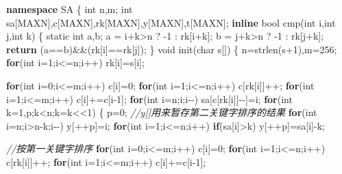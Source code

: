 \documentclass[
]{article}
\newenvironment{Shaded}{}{}
\newcommand{\AttributeTok}[1]{\textcolor[rgb]{0.49,0.56,0.16}{#1}}
\newcommand{\CommentTok}[1]{\textcolor[rgb]{0.38,0.63,0.69}{\textit{#1}}}
\newcommand{\ControlFlowTok}[1]{\textcolor[rgb]{0.00,0.44,0.13}{\textbf{#1}}}
\newcommand{\DataTypeTok}[1]{\textcolor[rgb]{0.56,0.13,0.00}{#1}}
\newcommand{\DecValTok}[1]{\textcolor[rgb]{0.25,0.63,0.44}{#1}}
\newcommand{\KeywordTok}[1]{\textcolor[rgb]{0.00,0.44,0.13}{\textbf{#1}}}
\newcommand{\NormalTok}[1]{#1}
\begin{document}
\begin{Shaded}
\begin{Highlighting}[]
\KeywordTok{namespace}\NormalTok{ SA}
\NormalTok{\{}
    \DataTypeTok{int}\NormalTok{ n,m;}
    \DataTypeTok{int}\NormalTok{ sa[MAXN],c[MAXN],rk[MAXN],y[MAXN],t[MAXN];}
    \KeywordTok{inline} \DataTypeTok{bool}\NormalTok{ cmp(}\DataTypeTok{int}\NormalTok{ i,}\DataTypeTok{int}\NormalTok{ j,}\DataTypeTok{int}\NormalTok{ k)}
\NormalTok{    \{}
        \AttributeTok{static} \DataTypeTok{int}\NormalTok{ a,b;}
\NormalTok{        a = i+k\textgreater{}n ? {-}}\DecValTok{1}\NormalTok{ : rk[i+k];}
\NormalTok{        b = j+k\textgreater{}n ? {-}}\DecValTok{1}\NormalTok{ : rk[j+k];}
        \ControlFlowTok{return}\NormalTok{ (a==b)\&\&(rk[i]==rk[j]);}
\NormalTok{    \}}
    \DataTypeTok{void}\NormalTok{ init(}\DataTypeTok{char}\NormalTok{ s[])}
\NormalTok{    \{}
\NormalTok{        n=strlen(s+}\DecValTok{1}\NormalTok{),m=}\DecValTok{256}\NormalTok{;}
        \ControlFlowTok{for}\NormalTok{(}\DataTypeTok{int}\NormalTok{ i=}\DecValTok{1}\NormalTok{;i\textless{}=n;i++) rk[i]=s[i];}

        \ControlFlowTok{for}\NormalTok{(}\DataTypeTok{int}\NormalTok{ i=}\DecValTok{0}\NormalTok{;i\textless{}=m;i++) c[i]=}\DecValTok{0}\NormalTok{;}
        \ControlFlowTok{for}\NormalTok{(}\DataTypeTok{int}\NormalTok{ i=}\DecValTok{1}\NormalTok{;i\textless{}=n;i++) c[rk[i]]++;}
        \ControlFlowTok{for}\NormalTok{(}\DataTypeTok{int}\NormalTok{ i=}\DecValTok{1}\NormalTok{;i\textless{}=m;i++) c[i]+=c[i{-}}\DecValTok{1}\NormalTok{];}
        \ControlFlowTok{for}\NormalTok{(}\DataTypeTok{int}\NormalTok{ i=n;i;i{-}{-}) sa[c[rk[i]]{-}{-}]=i;}
        \ControlFlowTok{for}\NormalTok{(}\DataTypeTok{int}\NormalTok{ k=}\DecValTok{1}\NormalTok{,p;k\textless{}n;k=k\textless{}\textless{}}\DecValTok{1}\NormalTok{)}
\NormalTok{        \{}
\NormalTok{            p=}\DecValTok{0}\NormalTok{;}
            \CommentTok{//y[]用来暂存第二关键字排序的结果}
            \ControlFlowTok{for}\NormalTok{(}\DataTypeTok{int}\NormalTok{ i=n;i\textgreater{}n{-}k;i{-}{-}) y[++p]=i;}
            \ControlFlowTok{for}\NormalTok{(}\DataTypeTok{int}\NormalTok{ i=}\DecValTok{1}\NormalTok{;i\textless{}=n;i++) }\ControlFlowTok{if}\NormalTok{(sa[i]\textgreater{}k) y[++p]=sa[i]{-}k;}

            \CommentTok{//按第一关键字排序}
            \ControlFlowTok{for}\NormalTok{(}\DataTypeTok{int}\NormalTok{ i=}\DecValTok{0}\NormalTok{;i\textless{}=m;i++) c[i]=}\DecValTok{0}\NormalTok{;}
            \ControlFlowTok{for}\NormalTok{(}\DataTypeTok{int}\NormalTok{ i=}\DecValTok{1}\NormalTok{;i\textless{}=n;i++) c[rk[i]]++;}
            \ControlFlowTok{for}\NormalTok{(}\DataTypeTok{int}\NormalTok{ i=}\DecValTok{1}\NormalTok{;i\textless{}=m;i++) c[i]+=c[i{-}}\DecValTok{1}\NormalTok{];}


\end{Highlighting}
\end{Shaded}
\end{document}
